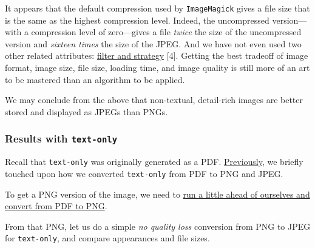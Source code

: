\documentclass[
  11pt,
  british,
  a4paper,
]{article}
\begin{document}
It appears that the default compression used by \texttt{ImageMagick}
gives a file size that is the same as the highest compression level.
Indeed, the uncompressed version---with a compression level of
zero---gives a file \emph{twice} the size of the uncompressed version
and \emph{sixteen times} the size of the JPEG. And we have not even used
two other related attributes:
\href{https://stackoverflow.com/questions/27267073/imagemagick-lossless-max-compression-for-png}{filter
and strategy} {[}4{]}. Getting the best tradeoff of image format, image
size, file size, loading time, and image quality is still more of an art
to be mastered than an algorithm to be applied.

We may conclude from the above that non-textual, detail-rich images are
better stored and displayed as JPEGs than PNGs.

\hypertarget{results-with-text-only}{%
\subsubsection{\texorpdfstring{Results with
\texttt{text-only}}{Results with text-only}}\label{results-with-text-only}}

Recall that \texttt{text-only} was originally generated as a PDF.
\protect\hyperlink{converting-text-only-from-pdf-to-png-and-jpeg}{Previously},
we briefly touched upon how we converted \texttt{text-only} from PDF to
PNG and JPEG.

To get a PNG version of the image, we need to
\protect\hyperlink{pdf-to-png-and-jpeg-poppler-and-cairo}{run a little
ahead of ourselves and convert from PDF to PNG}.

From that PNG, let us do a simple \emph{no quality loss} conversion from
PNG to JPEG for \texttt{text-only}, and compare appearances and file
sizes.
\end{document}
